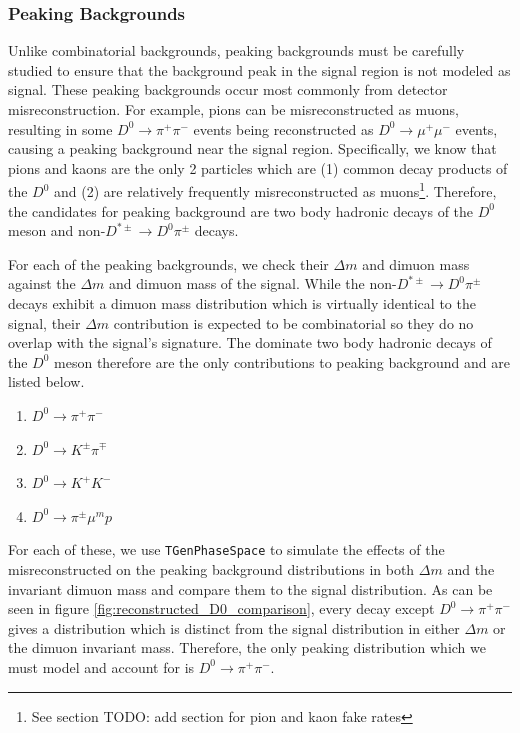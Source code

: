 \subsubsection{Peaking Backgrounds}

Unlike combinatorial backgrounds, peaking backgrounds must be carefully studied to ensure that the background peak in the signal region is not modeled as signal. These peaking backgrounds occur most commonly from detector misreconstruction. For example, pions can be misreconstructed as muons, resulting in some $D^0 \to \pi^+ \pi^-$ events being reconstructed as $D^0 \to \mu^+ \mu^-$ events, causing a peaking background near the signal region. Specifically, we know that pions and kaons are the only 2 particles which are (1) common decay products of the $D^0$ and (2) are relatively frequently misreconstructed as muons\footnote{See section TODO: add section for pion and kaon fake rates}. Therefore, the candidates for peaking background are two body hadronic decays of the $D^0$ meson and non-$D^{*\pm} \to D^0 \pi^\pm$ decays. 

For each of the peaking backgrounds, we check their $\Delta m$ and dimuon mass against the $\Delta m$ and dimuon mass of the signal. While the non-$D^{*\pm} \to D^0 \pi^\pm$ decays exhibit a dimuon mass distribution which is virtually identical to the signal, their $\Delta m$ contribution is expected to be combinatorial so they do no overlap with the signal's signature. The dominate two body hadronic decays of the $D^0$ meson therefore are the only contributions to peaking background and are listed below.
\begin{enumerate}
    \item $D^0 \to \pi^+ \pi^-$
    \item $D^0 \to K^\pm \pi^\mp$
    \item $D^0 \to K^+ K^-$
    \item $D^0 \to \pi^\pm \mu^mp$
\end{enumerate}
For each of these, we use \texttt{TGenPhaseSpace} to simulate the effects of the misreconstructed on the peaking background distributions in both $\Delta m$ and the invariant dimuon mass and compare them to the signal distribution. As can be seen in figure \ref{fig:reconstructed_D0_comparison}, every decay except $D^0 \to \pi^+ \pi^-$ gives a distribution which is distinct from the signal distribution in either $\Delta m$ or the dimuon invariant mass. Therefore, the only peaking distribution which we must model and account for is $D^0 \to \pi^+ \pi^-$. 

